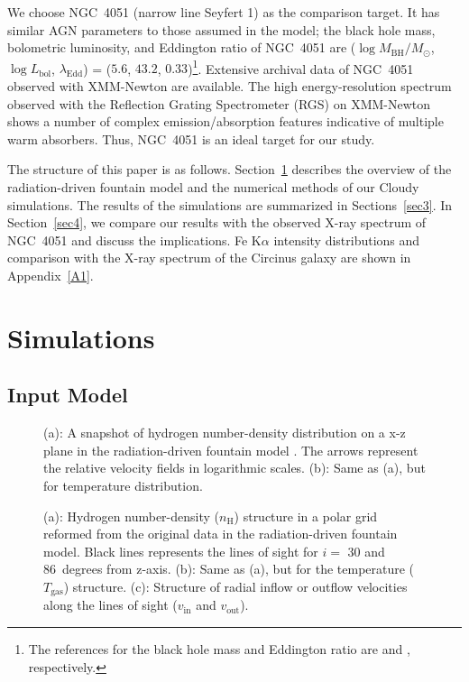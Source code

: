 \documentclass[twocolumn,times,twocolappendix]{aastex63}
\begin{document}
We choose NGC~4051 (narrow line Seyfert 1) as the comparison target.
It has similar AGN parameters to those assumed in
the \citet{Wada2016} model; the black hole mass, bolometric
luminosity, and Eddington ratio of NGC~4051 are ($\log
M_\mathrm{BH}/M_\odot$, $\log L_\mathrm{bol}$, $\lambda_\mathrm{Edd}$)
= ($5.6$, $43.2$, $0.33$)\footnote{The references for the black hole
  mass and Eddington ratio are \citet{Koss2017} and 
  \citet{Ogawa2021}, respectively.}.
Extensive archival data of NGC~4051 observed with XMM-Newton are available.
The high energy-resolution spectrum
observed with the
Reflection Grating Spectrometer (RGS) on XMM-Newton shows a number of
complex emission/absorption features indicative of multiple warm
absorbers.
Thus, NGC~4051 is an ideal target for our study.


The structure of this paper is as
follows. Section~\ref{sec2} describes the overview of the
radiation-driven fountain model and the numerical methods of our
\textsf{Cloudy} simulations. The results of the simulations are
summarized in Sections~\ref{sec3}. In Section~\ref{sec4}, we compare
our results with the observed X-ray spectrum of NGC~4051 
and discuss the implications.
Fe K$\alpha$ intensity distributions and 
comparison with the X-ray spectrum of the Circinus galaxy are shown in Appendix~\ref{A1}.


\section{Simulations}
\label{sec2}

\subsection{Input Model}
\label{sec2.1}


\begin{figure*}%
\caption{
(a): A snapshot of hydrogen number-density distribution on a x-z plane
  in the radiation-driven fountain model \citep{Wada2016}.
  The arrows represent the relative velocity fields in logarithmic scales. 
(b): Same as (a), but for temperature distribution. 
}
\label{fig_wada_model}
\end{figure*}

\begin{figure*}
\caption{
(a): Hydrogen number-density ($n_\mathrm{H}$) structure in a polar grid reformed from the original data in the radiation-driven fountain model. 
Black lines represents the lines of sight for $i=$ 30 and 86~degrees from z-axis.
(b): Same as (a), but for the temperature ($T_\mathrm{gas}$) structure.
(c): Structure of radial inflow or outflow velocities along the lines of sight ($v_\mathrm{in}$ and $v_\mathrm{out}$).
}
\label{fig_reformed}
\end{figure*}
\end{document}
